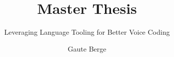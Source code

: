 \documentclass[a4paper,english]{ifimaster}
\title{Master Thesis}
\subtitle{Leveraging Language Tooling for Better Voice Coding}
\author{Gaute Berge}
\theoremstyle{break}
\begin{document}
% 




% 

% 

\backmatter{}
\printbibliography{}
\end{document}
